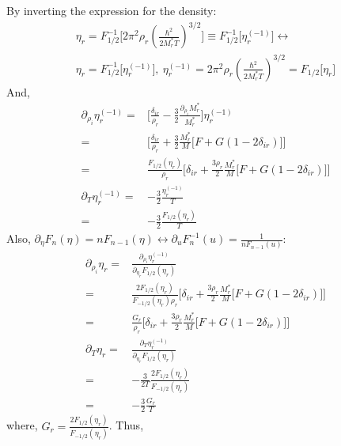 \documentclass[preprint,prc,preprintnumbers,superscriptaddress,amsmath,amssymb,floatfix]{revtex4-1}
\begin{document}
By inverting the expression for the density:
\begin{equation}
 \begin{split}
  \eta_r= F^{-1}_{1/2}\big[2 \pi^2 \rho_r(\frac{\hbar^2}{2 M_r^{*}T})^{3/2}\big]\equiv F^{-1}_{1/2}\big[\eta^{(-1)}_r\big]\leftrightarrow\\
  \eta_r= F^{-1}_{1/2}\big[\eta^{(-1)}_r\big],\ \eta^{(-1)}_r=2 \pi^2 \rho_r(\frac{\hbar^2}{2 M_r^{*}T})^{3/2} = F_{1/2}\big[\eta_r\big]
 \end{split}
\end{equation}
And, 
\begin{equation}
 \begin{split}
  \partial_{\rho_i}\eta^{(-1)}_r=&\big[\frac{\delta_{ir}}{\rho_r}-\frac{3}{2}\frac{\partial_{\rho_i}M_r^{*}}{M_r^{*}}\big] \eta^{(-1)}_r\\
  =&\Big[\frac{\delta_{ir}}{\rho_r}+\frac{3}{2}\frac{M_r^{*}}{M}\big[F+G(1-2\delta_{ir})\big]\Big] \\
  =&\frac{F_{1/2}(\eta_r)}{\rho_r}\Big[\delta_{ir}+\frac{3\rho_r}{2}\frac{M_r^{*}}{M}\big[F+G(1-2\delta_{ir})\big]\Big]\\
  \partial_{T}\eta^{(-1)}_r=&-\frac{3}{2}\frac{\eta_r^{(-1)}}{T}\\
  =&-\frac{3}{2}\frac{F_{1/2}(\eta_r)}{T}
 \end{split}
\end{equation}
Also, $\partial_{\eta}F_n(\eta)=nF_{n-1}(\eta) \leftrightarrow \partial_{u}F^{-1}_n(u)=\frac{1}{nF_{n-1}(u)}$:
\begin{equation}
 \begin{split}
  \partial_{\rho_i}\eta_r=&\frac{\partial_{\rho_i}\eta_r^{(-1)}}{\partial_{\eta_r}F_{1/2}(\eta_r)}\\
  =&\frac{2F_{1/2}(\eta_r)}{F_{-1/2}(\eta_r)\rho_r}\Big[\delta_{ir}+\frac{3\rho_r}{2}\frac{M_r^{*}}{M}\big[F+G(1-2\delta_{ir})\big]\Big]\\
  =&\frac{G_r}{\rho_r}\Big[\delta_{ir}+\frac{3\rho_r}{2}\frac{M_r^{*}}{M}\big[F+G(1-2\delta_{ir})\big]\Big]\\
  \partial_{T}\eta_r=&\frac{\partial_{T}\eta_r^{(-1)}}{\partial_{\eta_r}F_{1/2}(\eta_r)}\\
  =&-\frac{3}{2T}\frac{2F_{1/2}(\eta_r)}{F_{-1/2}(\eta_r)}\\
  =&-\frac{3}{2}\frac{G_r}{T}
 \end{split}
\end{equation}
where, $G_r = \frac{2 F_{1/2}(\eta_r)}{F_{-1/2}(\eta_r)}$.
Thus,
\end{document}

